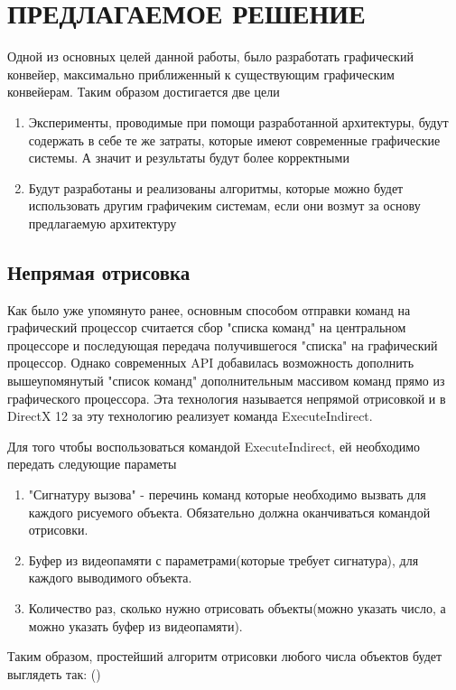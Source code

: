 \chapter{ПРЕДЛАГАЕМОЕ РЕШЕНИЕ} \label{ch3}
Одной из основных целей данной работы, было разработать графический конвейер, максимально приближенный к существующим графическим конвейерам. Таким образом достигается две цели
\begin{enumerate}[1.] 
	\item Эксперименты, проводимые при помощи разработанной архитектуры, будут содержать в себе те же затраты, которые имеют современные графические системы. А значит и результаты будут более корректными
	\item Будут разработаны и реализованы алгоритмы, которые можно будет использовать другим графичеким системам, если они возмут за основу предлагаемую архитектуру
\end{enumerate}

\section{Непрямая отрисовка} \label{ch3:indirect_draw}
	Как было уже упомянуто ранее, основным способом отправки команд на графический процессор считается сбор "списка команд" на центральном процессоре и последующая передача получившегося "списка" на графический процессор. Однако современных API добавилась возможность дополнить вышеупомянутый "список команд" дополнительным массивом команд прямо из графического процессора. Эта технология называется непрямой отрисовкой и в DirectX 12 за эту технологию реализует команда ExecuteIndirect. 
	
	Для того чтобы воспользоваться командой ExecuteIndirect, ей необходимо передать следующие параметы
	\begin{enumerate}[1.] 
		\item "Сигнатуру вызова" - перечинь команд которые необходимо вызвать для каждого рисуемого объекта. Обязательно должна оканчиваться командой отрисовки.
		\item Буфер из видеопамяти с параметрами(которые требует сигнатура), для каждого выводимого объекта.
		\item Количество раз, сколько нужно отрисовать объекты(можно указать число, а можно указать буфер из видеопамяти).
	\end{enumerate}
	
	Таким образом, простейший алгоритм отрисовки любого числа объектов будет выглядеть так: ()
	
